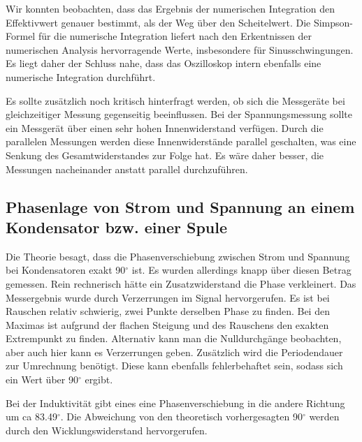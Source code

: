 \documentclass{article}
\begin{document}
Wir konnten beobachten, dass das Ergebnis der numerischen Integration den Effektivwert genauer bestimmt, als der Weg über den Scheitelwert. Die Simpson-Formel für die numerische Integration liefert nach den Erkentnissen der numerischen Analysis hervorragende Werte, insbesondere für Sinusschwingungen. Es liegt daher der Schluss nahe, dass das Oszilloskop intern ebenfalls eine numerische Integration durchführt.

Es sollte zusätzlich noch kritisch hinterfragt werden, ob sich die Messgeräte bei gleichzeitiger Messung gegenseitig beeinflussen. Bei der Spannungsmessung sollte ein Messgerät über einen sehr hohen Innenwiderstand verfügen. Durch die parallelen Messungen werden diese Innenwiderstände parallel geschalten, was eine Senkung des Gesamtwiderstandes zur Folge hat. Es wäre daher besser, die Messungen nacheinander anstatt parallel durchzuführen.


\subsection{Phasenlage von Strom und Spannung an einem Kondensator bzw. einer Spule}

Die Theorie besagt, dass die Phasenverschiebung zwischen Strom und Spannung bei Kondensatoren exakt 90$^\circ$ ist. Es wurden allerdings knapp über diesen Betrag gemessen. Rein rechnerisch hätte ein Zusatzwiderstand die Phase verkleinert. Das Messergebnis wurde durch Verzerrungen im Signal hervorgerufen. Es ist bei Rauschen relativ schwierig, zwei Punkte derselben Phase zu finden. Bei den Maximas ist aufgrund der flachen Steigung und des Rauschens den exakten Extrempunkt zu finden. Alternativ kann man die Nulldurchgänge beobachten, aber auch hier kann es Verzerrungen geben. Zusätzlich wird die Periodendauer zur Umrechnung benötigt. Diese kann ebenfalls fehlerbehaftet sein, sodass sich ein Wert über 90$^\circ$ ergibt.

Bei der Induktivität gibt eines eine Phasenverschiebung in die andere Richtung um ca 83.49$^\circ$. Die Abweichung von den theoretisch vorhergesagten 90$^\circ$ werden durch den Wicklungswiderstand hervorgerufen.
\end{document}

